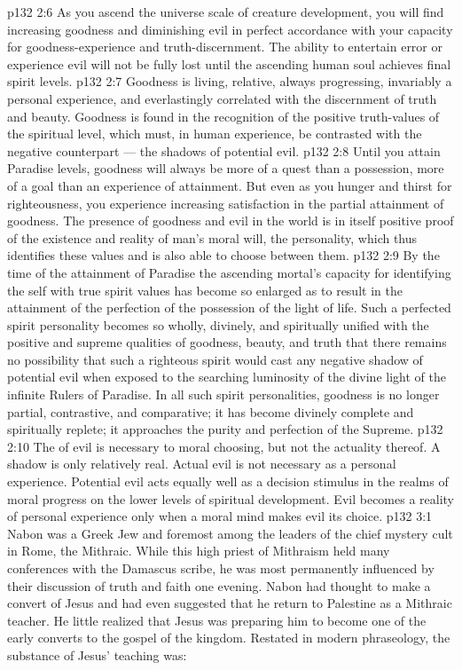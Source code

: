 \vs p132 2:6 \pc As you ascend the universe scale of creature development, you will find increasing goodness and diminishing evil in perfect accordance with your capacity for goodness\hyp{}experience and truth\hyp{}discernment. The ability to entertain error or experience evil will not be fully lost until the ascending human soul achieves final spirit levels.
\vs p132 2:7 Goodness is living, relative, always progressing, invariably a personal experience, and everlastingly correlated with the discernment of truth and beauty. Goodness is found in the recognition of the positive truth\hyp{}values of the spiritual level, which must, in human experience, be contrasted with the negative counterpart --- the shadows of potential evil.
\vs p132 2:8 \pc Until you attain Paradise levels, goodness will always be more of a quest than a possession, more of a goal than an experience of attainment. But even as you hunger and thirst for righteousness, you experience increasing satisfaction in the partial attainment of goodness. The presence of goodness and evil in the world is in itself positive proof of the existence and reality of man’s moral will, the personality, which thus identifies these values and is also able to choose between them.
\vs p132 2:9 By the time of the attainment of Paradise the ascending mortal’s capacity for identifying the self with true spirit values has become so enlarged as to result in the attainment of the perfection of the possession of the light of life. Such a perfected spirit personality becomes so wholly, divinely, and spiritually unified with the positive and supreme qualities of goodness, beauty, and truth that there remains no possibility that such a righteous spirit would cast any negative shadow of potential evil when exposed to the searching luminosity of the divine light of the infinite Rulers of Paradise. In all such spirit personalities, goodness is no longer partial, contrastive, and comparative; it has become divinely complete and spiritually replete; it approaches the purity and perfection of the Supreme.
\vs p132 2:10 The  of evil is necessary to moral choosing, but not the actuality thereof. A shadow is only relatively real. Actual evil is not necessary as a personal experience. Potential evil acts equally well as a decision stimulus in the realms of moral progress on the lower levels of spiritual development. Evil becomes a reality of personal experience only when a moral mind makes evil its choice.
\vs p132 3:1 Nabon was a Greek Jew and foremost among the leaders of the chief mystery cult in Rome, the Mithraic. While this high priest of Mithraism held many conferences with the Damascus scribe, he was most permanently influenced by their discussion of truth and faith one evening. Nabon had thought to make a convert of Jesus and had even suggested that he return to Palestine as a Mithraic teacher. He little realized that Jesus was preparing him to become one of the early converts to the gospel of the kingdom. Restated in modern phraseology, the substance of Jesus’ teaching was:
